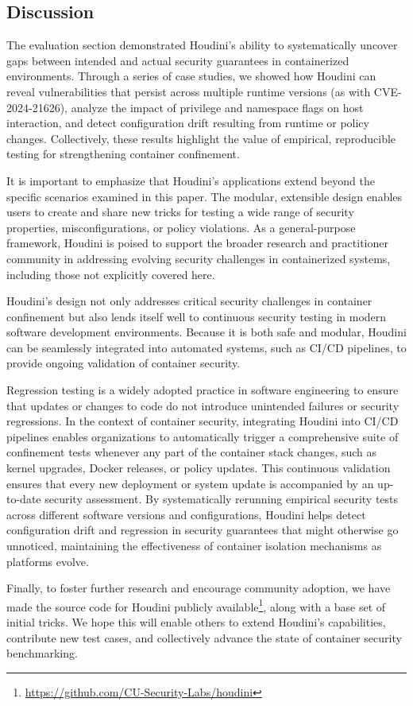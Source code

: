 \fontsize{12pt}{14pt} \selectfont
\begin{doublespace}
\chapter{Discussion}
The evaluation section demonstrated Houdini's ability to systematically uncover gaps between intended and actual security guarantees in containerized environments. Through a series of case studies, we showed how Houdini can reveal vulnerabilities that persist across multiple runtime versions (as with CVE-2024-21626), analyze the impact of privilege and namespace flags on host interaction, and detect configuration drift resulting from runtime or policy changes. Collectively, these results highlight the value of empirical, reproducible testing for strengthening container confinement.

It is important to emphasize that Houdini's applications extend beyond the specific scenarios examined in this paper. The modular, extensible design enables users to create and share new tricks for testing a wide range of security properties, misconfigurations, or policy violations. As a general-purpose framework, Houdini is poised to support the broader research and practitioner community in addressing evolving security challenges in containerized systems, including those not explicitly covered here.

Houdini's design not only addresses critical security challenges in container confinement but also lends itself well to continuous security testing in modern software development environments. Because it is both safe and modular, Houdini can be seamlessly integrated into automated systems, such as CI/CD pipelines, to provide ongoing validation of container security.

Regression testing is a widely adopted practice in software engineering to ensure that updates or changes to code do not introduce unintended failures or security regressions. In the context of container security, integrating Houdini into CI/CD pipelines enables organizations to automatically trigger a comprehensive suite of confinement tests whenever any part of the container stack changes, such as kernel upgrades, Docker releases, or policy updates. This continuous validation ensures that every new deployment or system update is accompanied by an up-to-date security assessment. By systematically rerunning empirical security tests across different software versions and configurations, Houdini helps detect configuration drift and regression in security guarantees that might otherwise go unnoticed, maintaining the effectiveness of container isolation mechanisms as platforms evolve.

Finally, to foster further research and encourage community adoption, we have made the source code for Houdini publicly available\footnote{\url{https://github.com/CU-Security-Labs/houdini}}, along with a base set of initial tricks. We hope this will enable others to extend Houdini's capabilities, contribute new test cases, and collectively advance the state of container security benchmarking.

\end{doublespace}